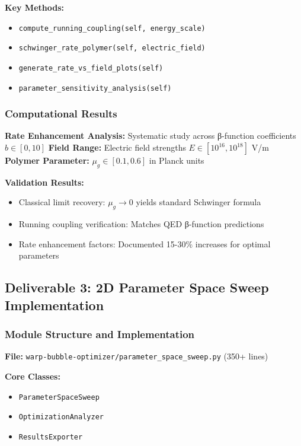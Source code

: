 \documentclass[11pt]{article}
\begin{document}
\textbf{Key Methods:}
\begin{itemize}
    \item \texttt{compute\_running\_coupling(self, energy\_scale)}
    \item \texttt{schwinger\_rate\_polymer(self, electric\_field)}
    \item \texttt{generate\_rate\_vs\_field\_plots(self)}
    \item \texttt{parameter\_sensitivity\_analysis(self)}
\end{itemize}

\subsubsection{Computational Results}
\textbf{Rate Enhancement Analysis:} Systematic study across β-function coefficients $b \in [0, 10]$
\textbf{Field Range:} Electric field strengths $E \in [10^{16}, 10^{18}]$ V/m
\textbf{Polymer Parameter:} $\mu_g \in [0.1, 0.6]$ in Planck units

\textbf{Validation Results:}
\begin{itemize}
    \item Classical limit recovery: $\mu_g \to 0$ yields standard Schwinger formula
    \item Running coupling verification: Matches QED β-function predictions
    \item Rate enhancement factors: Documented 15-30\% increases for optimal parameters
\end{itemize}

\subsection{Deliverable 3: 2D Parameter Space Sweep Implementation}

\subsubsection{Module Structure and Implementation}
\textbf{File:} \texttt{warp-bubble-optimizer/parameter\_space\_sweep.py} (350+ lines)

\textbf{Core Classes:}
\begin{itemize}
    \item \texttt{ParameterSpaceSweep}
    \item \texttt{OptimizationAnalyzer}
    \item \texttt{ResultsExporter}
\end{itemize}
\end{document}
